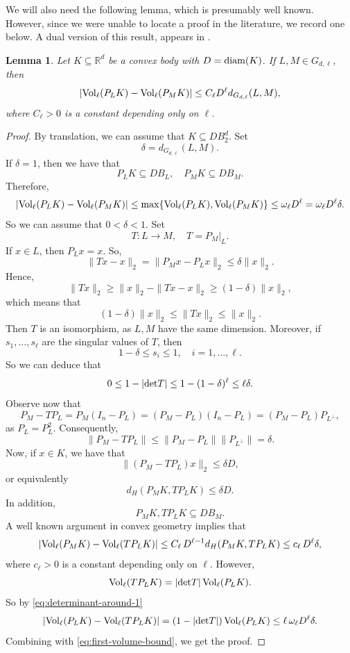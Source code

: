 \documentclass[10pt]{amsart}
\newcommand{\1}{\textbf{1}}
\newcommand{\vol}{{\rm Vol}}
\newcommand{\diam}{{\rm diam}}
\numberwithin{equation}{section} %
\newtheorem{lemma}[theorem]{Lemma}
\theoremstyle{remark}
\theoremstyle{definition}
\begin{document}
We will also need the following lemma, which is presumably well known. However, since we were unable to locate a proof in the literature, we record one below. A dual version of this result, appears in \cite[Theorem~2]{MTTT}.

\begin{lemma}\label{lem:projection-volume-lipschitz}
    Let $K \subseteq \mathbb{R}^d$ be a convex body with $D=\diam(K)$. If  $L,M \in G_{d,\ell}$, then \[|\vol_\ell (P_LK)-\vol_\ell (P_MK)| \leq C_{\ell} D^{\ell} d_{G_{d,\ell}}(L,M),\] where $C_\ell>0$ is a constant depending only on $\ell$.
\end{lemma}

\begin{proof}
    By translation, we can assume that $K \subseteq DB_2^d$. Set \[\delta= d_{G_{d,\ell}}(L,M).\] If $\delta=1$, then we have that \[P_LK \subseteq DB_{L}, \quad P_MK \subseteq DB_M.\] Therefore, \[|\vol_\ell (P_LK)-\vol_\ell (P_MK)| \leq \max\{\vol_\ell (P_LK),\vol_\ell (P_MK)\} \leq \omega_{\ell}D^{\ell}=\omega_\ell D^\ell\delta.\] So we can assume that $0 < \delta<1$. Set 
    \[T:L \to M, \quad T=P_M|_L.\]
    If $x \in L$, then $P_Lx=x$. So, \[\|Tx-x\|_2=\|P_Mx-P_Lx\|_2\leq \delta \|x\|_2.\] Hence, \[\|Tx\|_2\geq \|x\|_2-\|Tx-x\|_2 \geq (1-\delta)\|x\|_2,\] which means that \[(1-\delta)\|x\|_2\leq \|Tx\|_2\leq \|x\|_2.\] Then $T$ is an isomorphism, as $L,M$ have the same dimension. Moreover, if $s_1,\ldots,s_\ell$ are the singular values of $T$, then \[1-\delta \leq s_i \leq 1, \quad i=1,\ldots,\ell.\] So we can deduce that \begin{equation}\label{eq:determinant-around-1}
    0 \leq 1-|{\rm det}T| \leq 1-(1-\delta)^\ell \leq \ell \delta.
    \end{equation} Observe now that \[P_M-TP_L=P_M(I_n-P_L)=(P_M-P_L)(I_n-P_L)=(P_M-P_L)P_{L^\perp},\] as $P_L=P_L^2$. Consequently, \[\|P_M-TP_L\|\leq \|P_M-P_L\| \|P_{L^\perp}\|=\delta.\] Now, if $x \in K$, we have that \[\|(P_M-TP_L)x\|_2 \leq \delta D,\] or equivalently \[d_{H}(P_MK,TP_LK) \leq \delta D.\] In addition, \[P_MK, TP_LK \subseteq DB_M.\] A well known argument in convex geometry implies that \begin{equation}\label{eq:first-volume-bound}
    |\vol_\ell (P_MK)-\vol_\ell(TP_LK)|  \leq C_\ell\, D^{\ell-1} d_{H}(P_MK,TP_LK) \leq c_\ell\, D^\ell \delta,
    \end{equation} where $c_\ell>0$ is a constant depending only on $\ell$. However, \[\vol_\ell(TP_LK)=|{\rm det}T|\,\vol_\ell(P_LK).\] So by \eqref{eq:determinant-around-1} \[|\vol_{\ell}(P_LK)-\vol_\ell(TP_LK)|=(1-|{\rm det}T|)\, \vol_{\ell}(P_LK) \leq\ell\,\omega_\ell D^\ell \delta.\] Combining with \eqref{eq:first-volume-bound}, we get the proof.
\end{proof}
\end{document}
